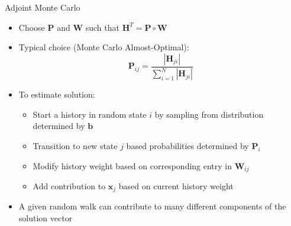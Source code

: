 \documentclass{beamer}
\begin{document}
\begin{frame}{Adjoint Monte Carlo}
\begin{itemize}
  \item Choose $\mathbf{P}$ and $\mathbf{W}$ such that
    $\mathbf{H}^{T} = \mathbf{P} \circ \mathbf{W}$
  \item Typical choice (Monte Carlo Almost-Optimal):
    \begin{equation*}
      \mathbf{P}_{ij} = \frac{| \mathbf{H}_{ji}| }
      {\sum_{i=1}^{N} | \mathbf{H}_{ji} |}
    \end{equation*}
  \item To estimate solution:
    \begin{itemize}
      \item Start a history in random state $i$ by sampling from distribution
        determined by $\mathbf{b}$
      \item Transition to new state $j$ based probabilities determined by
        $\mathbf{P}_i$
      \item Modify history weight based on corresponding entry in
        $\mathbf{W}_{ij}$
      \item Add contribution to $\mathbf{x}_j$ based on current history weight
    \end{itemize}
  \item A given random walk can contribute to many different components of
    the solution vector
\end{itemize}
\end{frame}
\end{document}
